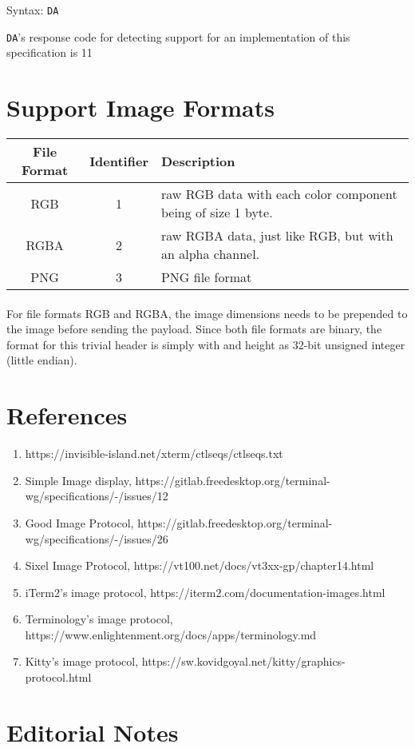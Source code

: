 \documentclass{article}
\newcommand{\code}[1]{\colorbox{light-gray}{\texttt{#1}}}
\newcommand{\DA}{\code{DA}}                          %
\begin{document}
Syntax: \DA

\DA's response code for detecting support for an implementation of this specification is 11

\section{Support Image Formats} %

\label{sec:supported-image-formtats}

\begin{tabular}{c | c | l}
    File Format & Identifier & Description \\ \hline
    RGB & 1 & raw RGB data with each color component being of size 1 byte. \\
    RGBA & 2 & raw RGBA data, just like RGB, but with an alpha channel. \\
    PNG & 3 & PNG file format \\
\end{tabular}

\paragraph{}

For file formats RGB and RGBA, the image dimensions needs to be prepended to the image
before sending the payload. Since both file formats are binary, the format for this trivial header
is simply with and height as 32-bit unsigned integer (little endian).

\section{References} %

\begin{enumerate}
    \item \label{ref:ctlseqs}https://invisible-island.net/xterm/ctlseqs/ctlseqs.txt
    \item \label{ref:simple-image-display}Simple Image display, https://gitlab.freedesktop.org/terminal-wg/specifications/-/issues/12
    \item \label{ref:gip}Good Image Protocol, https://gitlab.freedesktop.org/terminal-wg/specifications/-/issues/26
    \item \label{ref:image-sixel}Sixel Image Protocol, https://vt100.net/docs/vt3xx-gp/chapter14.html
    \item \label{ref:image-item2}iTerm2's image protocol, https://iterm2.com/documentation-images.html
    \item \label{ref:image-terminology}Terminology's image protocol, https://www.enlightenment.org/docs/apps/terminology.md 
    \item \label{ref:image-kitty}Kitty's image protocol, https://sw.kovidgoyal.net/kitty/graphics-protocol.html
\end{enumerate}

\section{Editorial Notes}
\listoftodos
\end{document}
